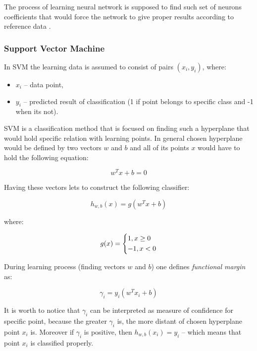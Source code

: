 \documentclass[magister]{dyplom}
\begin{document}
	The process of learning neural network is supposed to find such set of neurons coefficients that would force the network to give proper results according to reference data \cite{neural_networks_tutorial}.
	
	\subsubsection{Support Vector Machine}
	
	In \gls{SVM} the learning data is assumed to consist of pairs $(x_i, y_i)$, where:
	
	\begin{itemize}
		\item $x_i$ -- data point,
		\item $y_i$ -- predicted result of classification (1 if point belongs to specific class and -1 when its not).
	\end{itemize}
	
	\gls{SVM} is a classification method that is focused on finding such a hyperplane that would hold specific relation with learning points. In general chosen hyperplane would be defined by two vectors $w$ and $b$ and all of its points $x$ would have to hold the following equation:
	
	\begin{equation}
		w^T x + b = 0			
	\end{equation}
	
	Having these vectors lets to construct the following classifier:
	
	\begin{equation}
		h_{w,b}(x) = g(w^T x + b)
	\end{equation}
	
	where:
	
	\begin{equation}
		g(x) = 
		\begin{dcases}
			1, x \geq 0 \\
			-1, x < 0
		\end{dcases}
	\end{equation}
	
	During learning process (finding vectors $w$ and $b$) one defines \emph{functional margin} as:
	
	\begin{equation}
		\gamma_i = y_i (w^T x_i + b)
	\end{equation}
	
	It is worth to notice that $\gamma_i$ can be interpreted as measure of confidence for specific point, because the greater $\gamma_i$ is, the more distant of chosen hyperplane point $x_i$ is. Moreover if $\gamma_i$ is positive, then $h_{w,b}(x_i) = y_i$ -- which means that point $x_i$ is classified properly. \\
	
\end{document}
